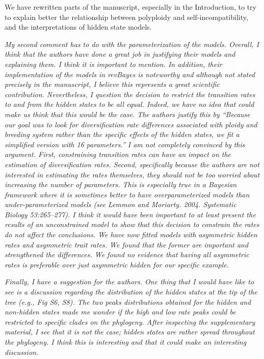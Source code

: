 \documentclass[11pt]{article}
\renewenvironment{quote}{\bigskip\noindent\itshape\ignorespaces}{\smallskip}
\begin{document}
We have rewritten parts of the manuscript, especially in the Introduction, to try to explain better the relationship between polyploidy and self-incompatibility, and the interpretations of hidden state models.

\begin{quote}
My second comment has to do with the parameterization of the models.
Overall, I think that the authors have done a great job in justifying their models and explaining them.
I think it is important to mention.
In addition, their implementation of the models in revBayes is noteworthy and although not stated precisely in the manuscript, I believe this represents a great scientific contribution. 
Nevertheless, I question the decision to restrict the transition rates to and from the hidden states to be all equal.
Indeed, we have no idea that could make us think that this would be the case.
The authors justify this by ``Because our goal was to look for diversification rate differences associated with ploidy and breeding system rather than the specific effects of the hidden states, we fit a simplified version with 16 parameters.''
I am not completely convinced by this argument.
First, constraining transition rates can have an impact on the estimation of diversification rates.
Second, specifically because the authors are not interested in estimating the rates themselves, they should not be too worried about increasing the number of parameters.
This is especially true in a Bayesian framework where it is sometimes better to have overparameterized models than under-parameterized models (see Lemmon and Moriarty. 2004. Systematic Biology 53:265–277).
I think it would have been important to at least present the results of an unconstrained model to show that this decision to constrain the rates do not affect the conclusions.
\end{quote}
We have now fitted models with asymmetric hidden rates and asymmetric trait rates. We found that the former are important and strengthened the differences. We found no evidence that having all asymmetric rates is preferable over just asymmetric hidden for our specific example. %

\begin{quote}
Finally, I have a suggestion for the authors.
One thing that I would have like to see is a discussion regarding the distribution of the hidden states at the tip of the tree (e.g., Fig S6, S8).
The two peaks distributions obtained for the hidden and non-hidden states made me wonder if the high and low rate peaks could be restricted to specific clades on the phylogeny.
After inspecting the supplementary material, I see that it is not the case; hidden states are rather spread throughout the phylogeny.
I think this is interesting and that it could make an interesting discussion.
\end{quote}
\end{document}
